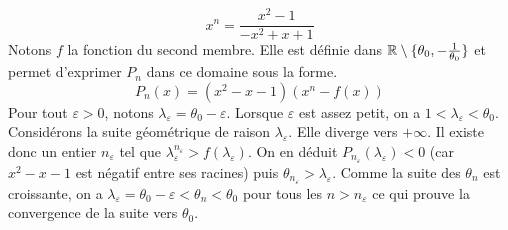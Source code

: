 \begin{enumerate}
\begin{enumerate}
\begin{displaymath}
 x^n = \frac{x^2-1}{-x^2+x+1}
\end{displaymath}
Notons $f$ la fonction du second membre. Elle est définie dans $\mathbb{R}\setminus\{ \theta_0,-\frac{1}{\theta_0}\}$ et permet d'exprimer $P_n$ dans ce domaine sous la forme.
\begin{displaymath}
 P_n(x) = (x^2-x-1)\left(x^n -f(x) \right) 
\end{displaymath}
Pour tout $\varepsilon >0$, notons $\lambda_\varepsilon = \theta_0-\varepsilon$. Lorsque $\varepsilon$ est assez petit, on a $1<\lambda_\varepsilon<\theta_0$. Considérons la suite géométrique de raison $\lambda_\varepsilon$. Elle diverge vers $+\infty$. Il existe donc un entier $n_\varepsilon$ tel que $\lambda_{\varepsilon}^{n_\varepsilon}>f(\lambda_\varepsilon)$. On en déduit $P_{n_\varepsilon}(\lambda_\varepsilon)<0$ (car $x^2-x-1$ est négatif entre ses racines) puis $\theta_{n_\varepsilon}>\lambda_\varepsilon$. Comme la suite des $\theta_n$ est croissante, on a $\lambda_\varepsilon=\theta_0 -\varepsilon< \theta_n <\theta_0$ pour tous les $n> n_\varepsilon$ ce qui prouve la convergence de la suite vers $\theta_0$.
\end{enumerate}
\end{enumerate}

